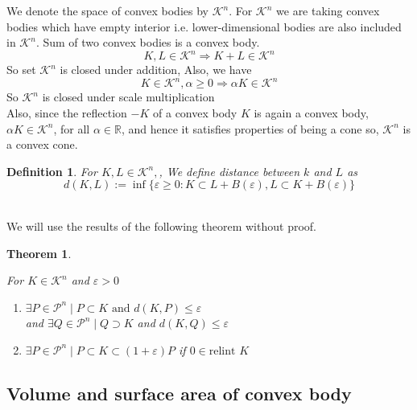\documentclass[oneside]{book}
\newtheorem{theorem}{Theorem}[section]
\newtheorem{mydef}{Definition}[section]
\begin{document}
	
	We denote the space of convex bodies by  $\mathcal{K}^{n}$. For  $\mathcal{K}^{n}$  we are taking convex bodies which have empty interior i.e. lower-dimensional bodies are also included in $\mathcal{K}^{n}$. 
	Sum of two convex bodies is a convex body. \\
	$$
	K, L \in \mathcal{K}^{n} \Longrightarrow K+L \in \mathcal{K}^{n}
	$$ 
	So  set $\mathcal{K}^{n}$ is closed under addition,
	Also, we have
	$$ 
	K \in \mathcal{K}^{n}, \alpha \geq 0 \Longrightarrow \alpha K \in \mathcal{K}^{n}
	$$
	So  $\mathcal{K}^{n}$ is closed under scale multiplication \\
	Also, since the reflection $-K$ of a convex body $K$ is again a convex body, $\alpha K \in \mathcal{K}^{n}$, for all $\alpha \in \mathbb{R}$, and hence it satisfies properties of being a cone so,  $\mathcal{K}^{n}$ is a convex cone.
	\begin{mydef}     \label{d:13}
		For  $ K, L \in \mathcal{K}^{n}, $, We define distance between $k$ and $L$ as 
		\begin{equation}
		\label{eq42}
		d(K, L):=\inf \{\varepsilon \geq 0: K \subset L+B(\varepsilon), L \subset K+B(\varepsilon)\}
		\end{equation}
	\end{mydef}
	\quad 
	\\
	We will use the results of the following theorem without proof. 
	
	\begin{theorem}
		\label{t:8}
		
		For  $K \in \mathcal{K}^{n}$ and $\varepsilon>0$ \\
		\begin{enumerate}
			\item
			\( \exists  P  \in \mathcal{P}^{n} \mid  P \subset K \text{ and }  d(K, P) \leq \varepsilon \) \\
			\hspace{10pt} and 
			\newline
			\( \exists Q \in \mathcal{P}^{n} \mid  Q \supset K \) and \( d(K, Q) \leq \varepsilon\)
			\item 
			\( \exists  P \in \mathcal{P}^{n} \mid P \subset K \subset(1+\varepsilon) P \) 
			if $0 \in \text{relint } K $ \label{4.1.5}
		\end{enumerate}
	\end{theorem}
	\subsection{Volume and surface area of convex body} \label{ss:19}
	
\end{document}
